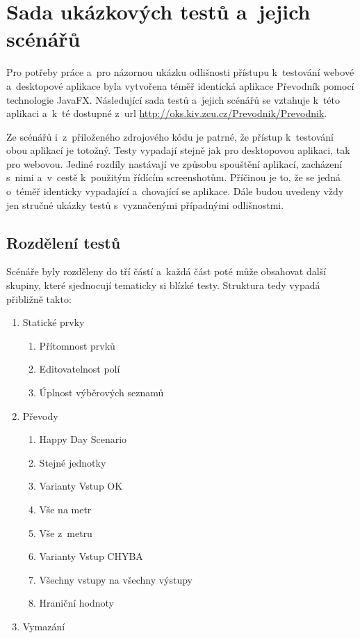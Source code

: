 \chapter{Sada ukázkových testů a~jejich scénářů}
Pro potřeby práce a~pro názornou ukázku odlišnosti přístupu k~testování webové a~desktopové aplikace byla vytvořena téměř identická aplikace Převodník pomocí technologie JavaFX. Následující sada testů a~jejich scénářů se vztahuje k~této aplikaci a~k~té dostupné z~url \url{http://oks.kiv.zcu.cz/Prevodnik/Prevodnik}.

Ze scénářů i~z~přiloženého zdrojového kódu je patrné, že přístup k~testování obou aplikací je totožný. Testy vypadají stejně jak pro desktopovou aplikaci, tak pro webovou. Jediné rozdíly nastávají ve způsobu spouštění aplikací, zacházení s~nimi a~v~cestě k~použitým řídícím screenshotům. Příčinou je to, že se jedná o~téměř identicky vypadající a~chovající se aplikace. Dále budou uvedeny vždy jen stručné ukázky testů s~vyznačenými případnými odlišnostmi.

	\section{Rozdělení testů}
	Scénáře byly rozděleny do tří částí a~každá část poté může obsahovat další skupiny, které sjednocují tematicky si blízké testy. Struktura tedy vypadá přibližně takto:
		{\renewcommand{\labelenumii}{\theenumii}
		\renewcommand{\theenumii}{\theenumi.\arabic{enumii}.}
		\begin{enumerate}
		\item Statické prvky
			\begin{enumerate}
			\item Přítomnost prvků
			\item Editovatelnost polí
			\item Úplnost výběrových seznamů
			\end{enumerate}
		\item Převody
			\begin{enumerate}
			\item Happy Day Scenario
			\item Stejné jednotky
			\item Varianty Vstup OK
			\item Vše na metr
			\item Vše z~metru
			\item Varianty Vstup CHYBA
			\item Všechny vstupy na všechny výstupy
			\item Hraniční hodnoty
			\end{enumerate}
		\item Vymazání
		\end{enumerate}}
		

